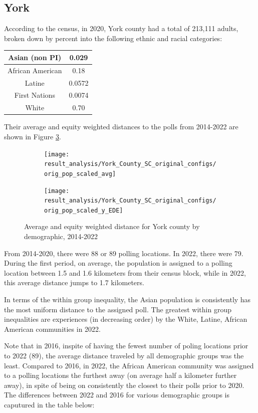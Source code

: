 \documentclass[11pt]{article}
\theoremstyle{remark}
\theoremstyle{definition}
\begin{document}
\subsection{York \label{sec:York distances}}
According to the census, in 2020, York county had a total of 213,111 adults, broken down by percent into the following ethnic and racial categories:

\begin{tabular} {| c | c |} 
\hline
 Asian (non PI) &  0.029 \\ \hline
African American & 0.18 \\ \hline
Latine & 0.0572 \\ \hline
First Nations & 0.0074 \\ \hline
White  & 0.70 \\ \hline
\end{tabular}

Their average and equity weighted distances to the polls from 2014-2022 are shown in Figure \ref{fig:York distance graphs}.

\begin{figure}
	\begin{subfigure}{.8\textwidth}
		\centering
		\texttt{[image: result\_analysis/York\_County\_SC\_original\_configs/orig\_pop\_scaled\_avg]}
		\label{sfig:York avg dist}
	\end{subfigure} \newline
	\begin{subfigure}{.8\textwidth}
		\centering
		\texttt{[image: result\_analysis/York\_County\_SC\_original\_configs/orig\_pop\_scaled\_y\_EDE]}
		\label{sfig:York equity dist}
	\end{subfigure}
	\caption{Average and equity weighted distance for York county by demographic, 2014-2022}
	\label{fig:York distance graphs}
\end{figure}

From 2014-2020, there were 88 or 89 polling locations. In 2022, there were 79. During the first period, on average, the population is assigned to a polling location between 1.5 and 1.6 kilometers from their census block, while in 2022, this average distance jumps to 1.7 kilometers. 

In terms of the within group inequality, the Asian population is consistently has the most uniform distance to the assigned poll. The greatest within group inequalities are experiences (in decreasing order) by the White, Latine, African American communities in 2022.

Note that in 2016, inspite of having the fewest number of poling locations prior to 2022 (89), the average distance traveled by all demographic groups was the least. Compared to 2016, in 2022, the African American community was assigned to a polling locations the furthest away (on average half a kilometer further away), in spite of being on consistently the closest to their polls prior to 2020. The differences between 2022 and 2016 for various demographic groups is caputured in the table below:
\end{document}
